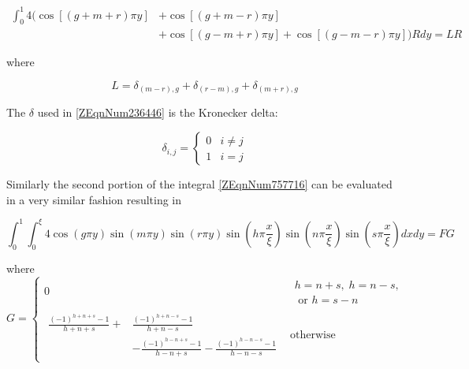\documentclass{article}
\newcommand{\spbox}[1]{ \text{ #1 }} %
\newcommand{\csp}{, \;} %
\newcommand{\cfunc}[5]{
    #1 = 
    \begin{cases} 
        #2 & #3 \\
        #4 & #5
    \end{cases}
}
\begin{document}
\begin{equation*} \begin{split}
    \int _{0}^{1} 4 (\cos \left[\left(g + m + r\right)\pi y\right]
    & + \cos \left[\left(g + m - r\right) \pi y\right] \\
    & + \cos \left[\left(g - m + r\right) \pi y\right]
    + \cos \left[\left(g - m - r\right) \pi y\right] ) R dy = LR
\end{split} \end{equation*} 

where

\begin{equation} \label{ZEqnNum236446} L=\delta _{\left(m-r\right),g} +\delta
_{\left(r-m\right),g} +\delta _{\left(m+r\right),g} \end{equation}

The $\delta $ used in \eqref{ZEqnNum236446} is the Kronecker delta:

\begin{equation*}
    \cfunc{\delta _{i,j}}
    {0}{i \ne j}
    {1}{i = j}
\end{equation*}

Similarly the second portion of the integral \eqref{ZEqnNum757716} can be
evaluated in a very similar fashion resulting in

\begin{equation*}
    \int _{0}^{1} \int _{0}^{\xi} 4 \cos \left(g\pi y\right)
    \sin \left(m \pi y\right) \sin \left(r \pi y\right) 
    \sin \left(h \pi \frac{x}{\xi } \right)
    \sin \left(n \pi \frac{x}{\xi } \right)
    \sin \left(s\pi \frac{x}{\xi } \right) dxdy
    = FG
\end{equation*}

where
\begin{equation} \label{ZEqnNum668374} 
    \cfunc{G}
    {0}{\begin{array}{l} 
        h = n + s \csp h = n - s, \\ 
        \spbox{or} h = s - n
    \end{array}}
    {\begin{array}{ll} 
        \frac{\left(-1\right)^{h + n + s} - 1}{h + n + s}  
       + & \frac{\left(-1\right)^{h + n - s} - 1}{h + n - s} \\
       & - \frac{\left(-1\right)^{h - n + s} - 1}{h - n + s} 
        - \frac{\left(-1\right)^{h - n - s} - 1}{h - n - s}
    \end{array}}{\text{otherwise}} 
\end{equation}
\end{document}
